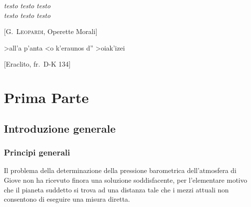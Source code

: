 \documentclass[%
,corpo=11pt
,twoside
,greek%
,cucitura
]{toptesi}
\begin{document}
\tablespagetrue\figurespagetrue %
\indici

\ifclassica   
\begin{citazioni}
        \textit{testo testo testo\\testo testo testo}

        [\textsc{G.\ Leopardi}, Operette Morali]

        \textgreek{>all'a p'anta <o k'eraunos d'' >oiak'izei}

        [Eraclito, fr.\ D-K 134]
    \end{citazioni}

\fi


\mainmatter

\part{Prima Parte}%
\chapter{Introduzione generale}

\section{Principi generali}
Il problema della determinazione della pressione barometrica dell'atmosfera di
Giove non ha ricevuto finora una soluzione soddisfacente, per l'elementare
motivo che il pianeta suddetto si trova ad una distanza tale che i mezzi attuali
non consentono di eseguire una misura diretta.
\end{document}
